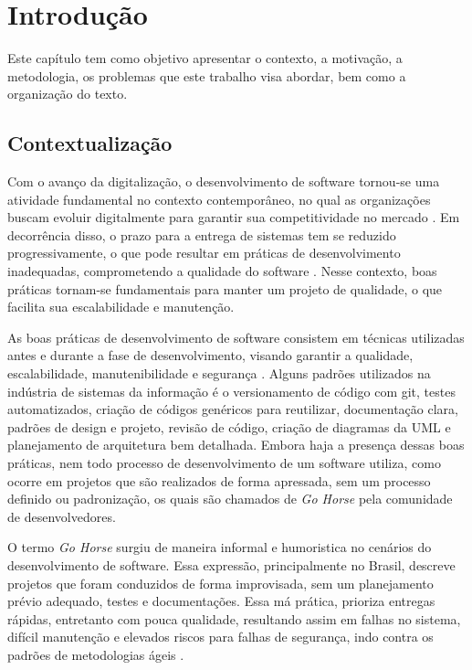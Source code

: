 \chapter{Introdução}
\label{sec:introducao}

    Este capítulo tem como objetivo apresentar o contexto, a motivação, a metodologia, os problemas que este trabalho visa abordar, bem como a organização do texto.

    \section{Contextualização}

    Com o avanço da digitalização, o desenvolvimento de software tornou-se uma atividade fundamental no contexto contemporâneo, no qual as organizações buscam evoluir digitalmente para garantir sua competitividade no mercado \cite[]{cardoso2019and}. Em decorrência disso, o prazo para a entrega de sistemas tem se reduzido progressivamente, o que pode resultar em práticas de desenvolvimento inadequadas, comprometendo a qualidade do software \cite[]{Kuutila2019Time}. Nesse contexto, boas práticas tornam-se fundamentais para manter um projeto de qualidade, o que facilita sua escalabilidade e manutenção.

    As boas práticas de desenvolvimento de software consistem em técnicas utilizadas antes e durante  a fase de desenvolvimento, visando garantir a qualidade, escalabilidade, manutenibilidade e segurança \cite[]{braga2007visao}. Alguns padrões utilizados na indústria de sistemas da informação é o versionamento de código com git, testes automatizados, criação de códigos genéricos para reutilizar, documentação clara, padrões de design e projeto, revisão de código, criação de diagramas da UML e planejamento de arquitetura bem detalhada. Embora haja a presença dessas boas práticas, nem todo processo de desenvolvimento de um software utiliza, como ocorre em projetos que são realizados de forma apressada, sem um processo definido ou padronização, os quais são chamados de \textit{Go Horse} \cite[]{sturmaplicaccao} pela comunidade de desenvolvedores.

    O termo \textit{Go Horse} surgiu de maneira informal e humoristica no cenários do desenvolvimento de software. Essa expressão, principalmente no Brasil, descreve projetos que foram conduzidos de forma improvisada, sem um planejamento prévio adequado, testes e documentações. Essa má prática, prioriza entregas rápidas, entretanto com pouca qualidade, resultando assim em falhas no sistema, difícil manutenção e elevados riscos para falhas de segurança, indo contra os padrões de metodologias ágeis \cite[]{perry2016funccao}.

